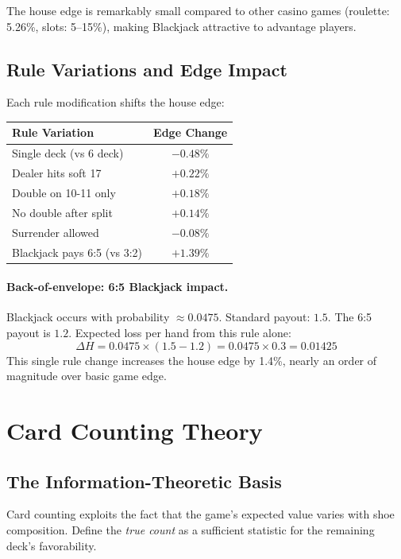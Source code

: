 \documentclass[11pt,a4paper]{article}
\theoremstyle{definition}
\begin{document}
The house edge is remarkably small compared to other casino games (roulette: 5.26\%, slots: 5--15\%), making Blackjack attractive to advantage players.

\subsection{Rule Variations and Edge Impact}

Each rule modification shifts the house edge:

\begin{center}
\begin{tabular}{lc}
\toprule
Rule Variation & Edge Change \\
\midrule
Single deck (vs 6 deck) & $-0.48\%$ \\
Dealer hits soft 17 & $+0.22\%$ \\
Double on 10-11 only & $+0.18\%$ \\
No double after split & $+0.14\%$ \\
Surrender allowed & $-0.08\%$ \\
Blackjack pays 6:5 (vs 3:2) & $+1.39\%$ \\
\bottomrule
\end{tabular}
\end{center}

\paragraph{Back-of-envelope: 6:5 Blackjack impact.} Blackjack occurs with probability $\approx 0.0475$. Standard payout: $1.5$. The 6:5 payout is $1.2$. Expected loss per hand from this rule alone:
\[
\Delta H = 0.0475 \times (1.5 - 1.2) = 0.0475 \times 0.3 = 0.01425
\]
This single rule change increases the house edge by 1.4\%, nearly an order of magnitude over basic game edge.

\section{Card Counting Theory}

\subsection{The Information-Theoretic Basis}

Card counting exploits the fact that the game's expected value varies with shoe composition. Define the \textit{true count} as a sufficient statistic for the remaining deck's favorability.
\end{document}
